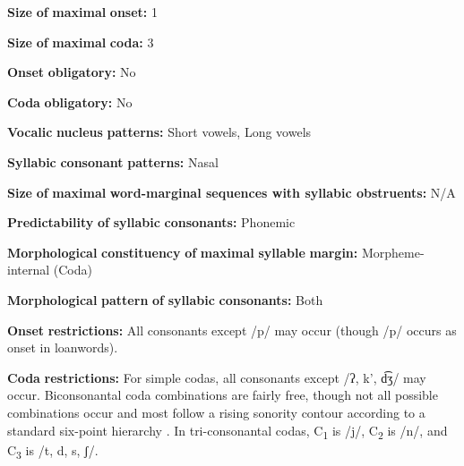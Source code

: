 \documentclass[output=paper]{langsci/langscibook}
\begin{document}
\begin{styleBody}
\textbf{Size} \textbf{of} \textbf{maximal} \textbf{onset:} 1
\end{styleBody}

\begin{styleBody}
\textbf{Size} \textbf{of} \textbf{maximal} \textbf{coda:} 3
\end{styleBody}

\begin{styleBody}
\textbf{Onset} \textbf{obligatory:} No
\end{styleBody}

\begin{styleBody}
\textbf{Coda} \textbf{obligatory:} No
\end{styleBody}

\begin{styleBody}
\textbf{Vocalic} \textbf{nucleus} \textbf{patterns:} Short vowels, Long vowels
\end{styleBody}

\begin{styleBody}
\textbf{Syllabic} \textbf{consonant} \textbf{patterns:} Nasal
\end{styleBody}

\begin{styleBody}
\textbf{Size} \textbf{of} \textbf{maximal} \textbf{word{}-marginal sequences with syllabic obstruents:} N/A
\end{styleBody}

\begin{styleBody}
\textbf{Predictability} \textbf{of} \textbf{syllabic} \textbf{consonants:} Phonemic
\end{styleBody}

\begin{styleBody}
\textbf{Morphological} \textbf{constituency} \textbf{of} \textbf{maximal} \textbf{syllable} \textbf{margin:} Morpheme-internal (Coda)
\end{styleBody}

\begin{styleBody}
\textbf{Morphological} \textbf{pattern} \textbf{of} \textbf{syllabic} \textbf{consonants:} Both
\end{styleBody}

\begin{styleBody}
\textbf{Onset} \textbf{restrictions:} All consonants except /p/ may occur (though /p/ occurs as onset in loanwords).
\end{styleBody}

\begin{styleBody}
\textbf{Coda} \textbf{restrictions:} For simple codas, all consonants except /ʔ, k’, d͡ʒ/ may occur. Biconsonantal coda combinations are fairly free, though not all possible combinations occur and most follow a rising sonority contour according to a standard six-point hierarchy . In tri-consonantal codas, C\textsubscript{1} is /j/, C\textsubscript{2} is /n/, and C\textsubscript{3} is /t, d, s, ʃ/.
\end{styleBody}
\end{document}
